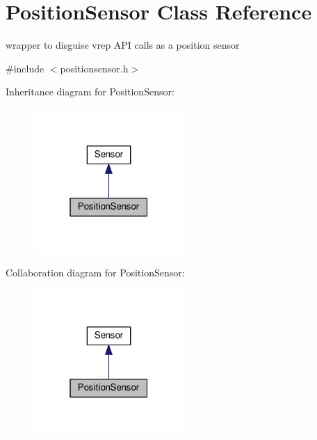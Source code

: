 \hypertarget{classPositionSensor}{}\section{Position\+Sensor Class Reference}
\label{classPositionSensor}


wrapper to disguise vrep A\+PI calls as a position sensor  




{\ttfamily \#include $<$positionsensor.\+h$>$}



Inheritance diagram for Position\+Sensor\+:\nopagebreak
\begin{figure}[H]
\begin{center}
\leavevmode
\includegraphics[width=163pt]{classPositionSensor__inherit__graph}
\end{center}
\end{figure}


Collaboration diagram for Position\+Sensor\+:\nopagebreak
\begin{figure}[H]
\begin{center}
\leavevmode
\includegraphics[width=163pt]{classPositionSensor__coll__graph}
\end{center}
\end{figure}
